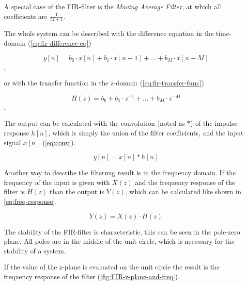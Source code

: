 A special case of the \ac{FIR}-filter is the \textit{Moving Average Filter}, at which all coefficients are $\frac{1}{M+1}$.

The whole system can be described with the difference equation in the time-domain (\autoref{eq:fir-difference-eq})

\begin{equation}
    y[n] = b_0 \cdot x[n] + b_1 \cdot x[n-1] + ... + b_M \cdot x[n-M]
    \label{eq:fir-difference-eq}
\end{equation},

or with the transfer function in the z-domain (\autoref{eq:fir-transfer-func})

\begin{equation}
    H(z) = b_0 + b_1 \cdot z^{-1} + ... + b_M \cdot z^{-M}
    \label{eq:fir-transfer-func}
\end{equation}.

The output can be calculated with the convolution (noted as $*$) of the impulse response $h[n]$, which is simply the
union of the filter coefficients, and the input signal $x[n]$ (\autoref{eq:conv}).

\begin{equation}
    y[n] = x[n] * h[n]
    \label{eq:conv}
\end{equation}

Another way to describe the filterung result is in the frequency domain.
If the frequency of the input is given with $X(z)$ and the frequency response of the filter is $H(z)$
than the output is $Y(z)$, which can be calculated like shown in \autoref{eq:freq-response}.

\begin{equation}
    Y(z) = X(z) \cdot H(z)
    \label{eq:freq-response}
\end{equation}

The stability of the \ac{FIR}-filter is characteristic, this can be seen in the pole-zero plane. All poles are in
the middle of the unit circle, which is necessary for the stability of a system.

If the value of the z-plane is evaluated on the unit circle the result is the frequency response of the filter
(\autoref{fig:FIR-z-plane-and-freq}).

